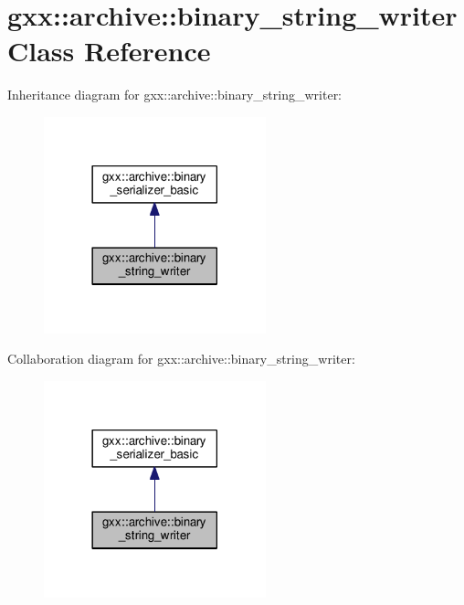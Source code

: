 \hypertarget{classgxx_1_1archive_1_1binary__string__writer}{}\section{gxx\+:\+:archive\+:\+:binary\+\_\+string\+\_\+writer Class Reference}
\label{classgxx_1_1archive_1_1binary__string__writer}


Inheritance diagram for gxx\+:\+:archive\+:\+:binary\+\_\+string\+\_\+writer\+:
\nopagebreak
\begin{figure}[H]
\begin{center}
\leavevmode
\includegraphics[width=182pt]{classgxx_1_1archive_1_1binary__string__writer__inherit__graph}
\end{center}
\end{figure}


Collaboration diagram for gxx\+:\+:archive\+:\+:binary\+\_\+string\+\_\+writer\+:
\nopagebreak
\begin{figure}[H]
\begin{center}
\leavevmode
\includegraphics[width=182pt]{classgxx_1_1archive_1_1binary__string__writer__coll__graph}
\end{center}
\end{figure}
